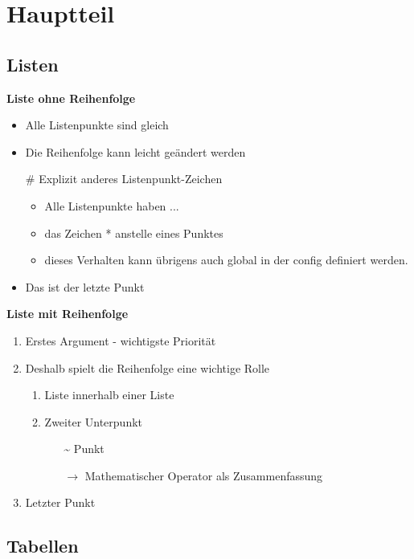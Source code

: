 \chapter{Hauptteil}
\label{cha:haupteil}

\section{Listen}
\label{sec:listen}

\textbf{Liste ohne Reihenfolge}
\begin{itemize}
    \item Alle Listenpunkte sind gleich
    \item Die Reihenfolge kann leicht geändert werden
    \item[\#] Explizit anderes Listenpunkt-Zeichen
    \begin{itemize}[*]
        \item Alle Listenpunkte haben ...
        \item das Zeichen * anstelle eines Punktes
        \item dieses Verhalten kann übrigens auch global in der config definiert werden.
    \end{itemize}
    \item Das ist der letzte Punkt
\end{itemize}

\textbf{Liste mit Reihenfolge}
\begin{enumerate}
    \item Erstes Argument - wichtigste Priorität
    \item Deshalb spielt die Reihenfolge eine wichtige Rolle
    \begin{enumerate}
        \item Liste innerhalb einer Liste
        \item Zweiter Unterpunkt
        \begin{itemize}
            \item[\textasciitilde] Punkt
            \item[$\to$] Mathematischer Operator als Zusammenfassung
        \end{itemize}
    \end{enumerate}
    \item Letzter Punkt
\end{enumerate}


\section{Tabellen}
\label{sec:tabellen}

